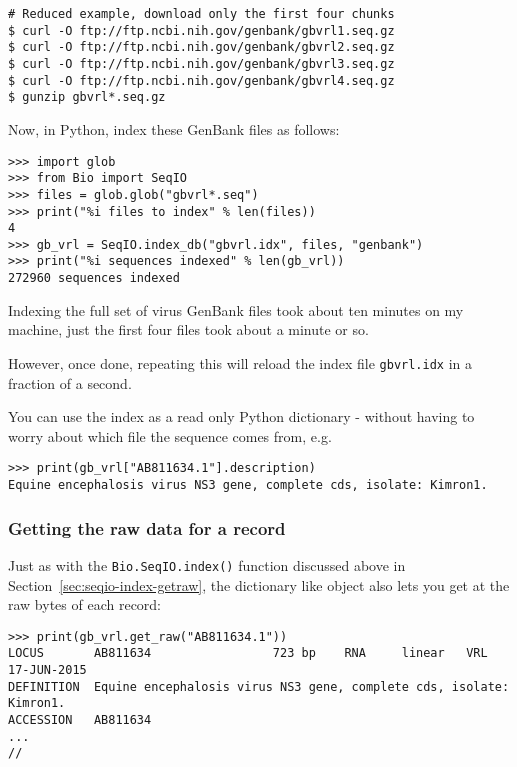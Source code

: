 \begin{verbatim}
# Reduced example, download only the first four chunks
$ curl -O ftp://ftp.ncbi.nih.gov/genbank/gbvrl1.seq.gz
$ curl -O ftp://ftp.ncbi.nih.gov/genbank/gbvrl2.seq.gz
$ curl -O ftp://ftp.ncbi.nih.gov/genbank/gbvrl3.seq.gz
$ curl -O ftp://ftp.ncbi.nih.gov/genbank/gbvrl4.seq.gz
$ gunzip gbvrl*.seq.gz
\end{verbatim}

Now, in Python, index these GenBank files as follows:

\begin{verbatim}
>>> import glob
>>> from Bio import SeqIO
>>> files = glob.glob("gbvrl*.seq")
>>> print("%i files to index" % len(files))
4
>>> gb_vrl = SeqIO.index_db("gbvrl.idx", files, "genbank")
>>> print("%i sequences indexed" % len(gb_vrl))
272960 sequences indexed
\end{verbatim}

Indexing the full set of virus GenBank files took about ten minutes on my machine,
just the first four files took about a minute or so.

However, once done, repeating this will reload the index file \verb|gbvrl.idx|
in a fraction of a second.

You can use the index as a read only Python dictionary - without having to worry
about which file the sequence comes from, e.g.

\begin{verbatim}
>>> print(gb_vrl["AB811634.1"].description)
Equine encephalosis virus NS3 gene, complete cds, isolate: Kimron1.
\end{verbatim}

\subsubsection{Getting the raw data for a record}

Just as with the \verb|Bio.SeqIO.index()| function discussed above in
Section~\ref{sec:seqio-index-getraw}, the dictionary like object also lets you
get at the raw bytes of each record:

%
\begin{verbatim}
>>> print(gb_vrl.get_raw("AB811634.1"))
LOCUS       AB811634                 723 bp    RNA     linear   VRL 17-JUN-2015
DEFINITION  Equine encephalosis virus NS3 gene, complete cds, isolate: Kimron1.
ACCESSION   AB811634
...
//
\end{verbatim}

